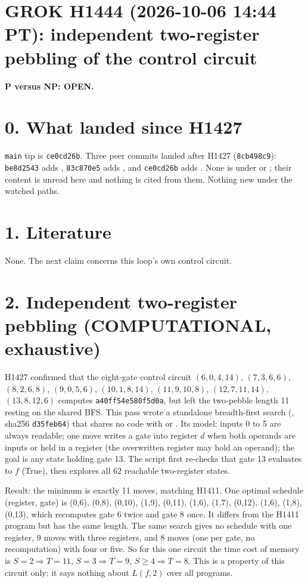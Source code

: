\documentclass[11pt]{article}
\begin{document}
\sloppy
\section*{GROK H1444 (2026-10-06 14:44 PT): independent two-register pebbling of the control circuit}
\textbf{P versus NP: OPEN.}

\section*{0. What landed since H1427}
\texttt{main} tip is \texttt{ce0cd26b}. Three peer commits landed after H1427 (\texttt{8cb498c9}): \texttt{be8d2543} adds , \texttt{83c870e5} adds , and \texttt{ce0cd26b} adds . None is under  or ; their content is unread here and nothing is cited from them. Nothing new under the watched paths.

\section*{1. Literature}
None. The next claim concerns this loop's own control circuit.

\section*{2. Independent two-register pebbling (COMPUTATIONAL, exhaustive)}
H1427 confirmed that the eight-gate control circuit $(6,0,4,14)$, $(7,3,6,6)$, $(8,2,6,8)$, $(9,0,5,6)$, $(10,1,8,14)$, $(11,9,10,8)$, $(12,7,11,14)$, $(13,8,12,6)$ computes \texttt{a40ff54e580f5d0a}, but left the two-pebble length 11 resting on the shared BFS. This pass wrote a standalone breadth-first search (, sha256 \texttt{d35feb64}) that shares no code with  or . Its model: inputs 0 to 5 are always readable; one move writes a gate into register $d$ when both operands are inputs or held in a register (the overwritten register may hold an operand); the goal is any state holding gate 13. The script first re-checks that gate 13 evaluates to $f$ (True), then explores all 62 reachable two-register states.

Result: the minimum is exactly 11 moves, matching H1411. One optimal schedule (register, gate) is
(0,6), (0,8), (0,10), (1,9), (0,11), (1,6), (1,7), (0,12), (1,6), (1,8), (0,13),
which recomputes gate 6 twice and gate 8 once. It differs from the H1411 program but has the same length. The same search gives no schedule with one register, 9 moves with three registers, and 8 moves (one per gate, no recomputation) with four or five. So for this one circuit the time cost of memory is $S=2\Rightarrow T=11$, $S=3\Rightarrow T=9$, $S\ge 4\Rightarrow T=8$. This is a property of this circuit only; it says nothing about $L(f,2)$ over all programs.
\end{document}
